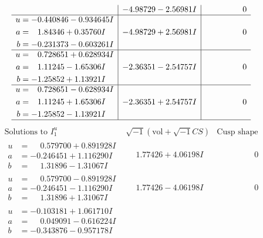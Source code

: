 \documentclass[1p]{elsarticle_modified}
\theoremstyle{definition}
\newcommand{\I}{\sqrt{-1}}
\begin{document}
$$\begin{array}{c|c|c}
 & -4.98729 - 2.56981 I & \phantom{-0.000000 } 0 \\ \hline\begin{aligned}
u &= -0.440846 - 0.934645 I \\
a &= \phantom{-}1.84346 + 0.35760 I \\
b &= -0.231373 - 0.603261 I\end{aligned}
 & -4.98729 + 2.56981 I & \phantom{-0.000000 } 0 \\ \hline\begin{aligned}
u &= \phantom{-}0.728651 + 0.628934 I \\
a &= \phantom{-}1.11245 - 1.65306 I \\
b &= -1.25852 + 1.13921 I\end{aligned}
 & -2.36351 - 2.54757 I & \phantom{-0.000000 } 0 \\ \hline\begin{aligned}
u &= \phantom{-}0.728651 - 0.628934 I \\
a &= \phantom{-}1.11245 + 1.65306 I \\
b &= -1.25852 - 1.13921 I\end{aligned}
 & -2.36351 + 2.54757 I & \phantom{-0.000000 } 0\\
 \hline 
 \end{array}$$\newpage$$\begin{array}{c|c|c}  
\text{Solutions to }I^u_{1}& \I (\text{vol} + \sqrt{-1}CS) & \text{Cusp shape}\\
 \hline 
\begin{aligned}
u &= \phantom{-}0.579700 + 0.891928 I \\
a &= -0.246451 + 1.116290 I \\
b &= \phantom{-}1.31896 - 1.31067 I\end{aligned}
 & \phantom{-}1.77426 + 4.06198 I & \phantom{-0.000000 } 0 \\ \hline\begin{aligned}
u &= \phantom{-}0.579700 - 0.891928 I \\
a &= -0.246451 - 1.116290 I \\
b &= \phantom{-}1.31896 + 1.31067 I\end{aligned}
 & \phantom{-}1.77426 - 4.06198 I & \phantom{-0.000000 } 0 \\ \hline\begin{aligned}
u &= -0.103181 + 1.061710 I \\
a &= \phantom{-}0.049091 - 0.616224 I \\
b &= -0.343876 - 0.957178 I\end{aligned}

\end{array}$$
\end{document}
